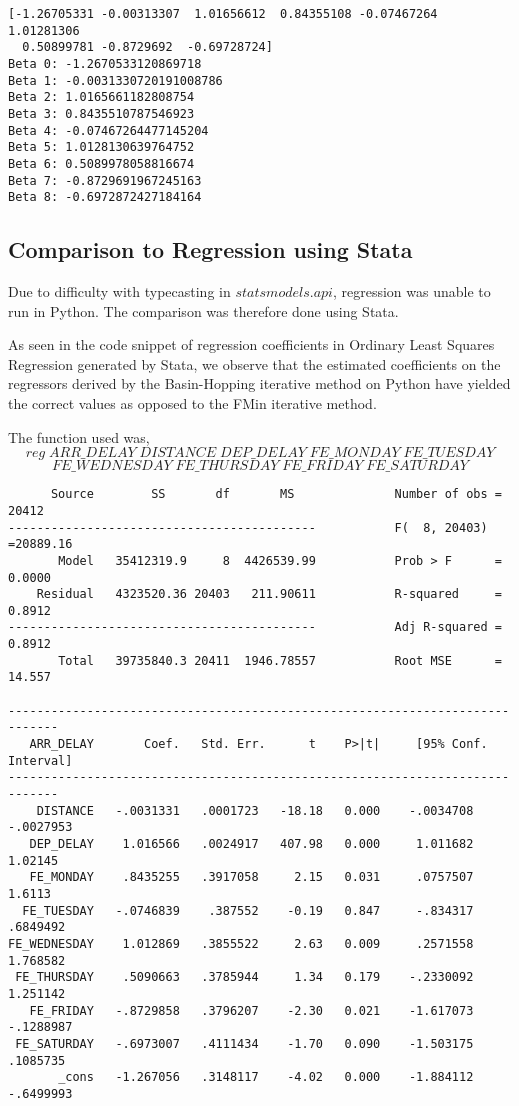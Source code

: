 \documentclass{article}
\begin{document}
\begin{lstlisting}
[-1.26705331 -0.00313307  1.01656612  0.84355108 -0.07467264  1.01281306
  0.50899781 -0.8729692  -0.69728724]
Beta 0: -1.2670533120869718
Beta 1: -0.0031330720191008786
Beta 2: 1.0165661182808754
Beta 3: 0.8435510787546923
Beta 4: -0.07467264477145204
Beta 5: 1.0128130639764752
Beta 6: 0.5089978058816674
Beta 7: -0.8729691967245163
Beta 8: -0.6972872427184164
\end{lstlisting}

\subsection{Comparison to Regression using Stata}
Due to difficulty with typecasting in $statsmodels.api$, regression was unable to run in Python. The comparison was therefore done using Stata.

As seen in the code snippet of regression coefficients in Ordinary Least Squares Regression generated by Stata, we observe that the estimated coefficients on the regressors derived by the Basin-Hopping iterative method on Python have yielded the correct values as opposed to the FMin iterative method.

The function used was,$$reg\;ARR\_DELAY\;DISTANCE\;DEP\_DELAY\;FE\_MONDAY\;FE\_TUESDAY$$ $$FE\_WEDNESDAY\;FE\_THURSDAY\;FE\_FRIDAY\;FE\_SATURDAY$$

\begin{lstlisting}
      Source        SS       df       MS              Number of obs =   20412
-------------------------------------------           F(  8, 20403) =20889.16
       Model   35412319.9     8  4426539.99           Prob > F      =  0.0000
    Residual   4323520.36 20403   211.90611           R-squared     =  0.8912
-------------------------------------------           Adj R-squared =  0.8912
       Total   39735840.3 20411  1946.78557           Root MSE      =  14.557

-----------------------------------------------------------------------------
   ARR_DELAY       Coef.   Std. Err.      t    P>|t|     [95% Conf. Interval]
-----------------------------------------------------------------------------
    DISTANCE   -.0031331   .0001723   -18.18   0.000    -.0034708   -.0027953
   DEP_DELAY    1.016566   .0024917   407.98   0.000     1.011682     1.02145
   FE_MONDAY    .8435255   .3917058     2.15   0.031     .0757507      1.6113
  FE_TUESDAY   -.0746839    .387552    -0.19   0.847     -.834317    .6849492
FE_WEDNESDAY    1.012869   .3855522     2.63   0.009     .2571558    1.768582
 FE_THURSDAY    .5090663   .3785944     1.34   0.179    -.2330092    1.251142
   FE_FRIDAY   -.8729858   .3796207    -2.30   0.021    -1.617073   -.1288987
 FE_SATURDAY   -.6973007   .4111434    -1.70   0.090    -1.503175    .1085735
       _cons   -1.267056   .3148117    -4.02   0.000    -1.884112   -.6499993
\end{lstlisting}
\end{document}
